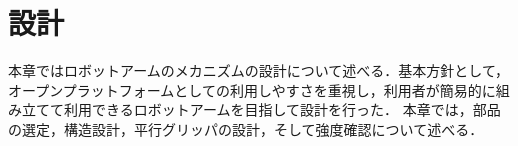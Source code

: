 \chapter{設計}
\label{chap:third}
%
本章ではロボットアームのメカニズムの設計について述べる．基本方針として，オープンプラットフォームとしての利用しやすさを重視し，利用者が簡易的に組み立てて利用できるロボットアームを目指して設計を行った．
本章では，部品の選定，構造設計，平行グリッパの設計，そして強度確認について述べる．





%